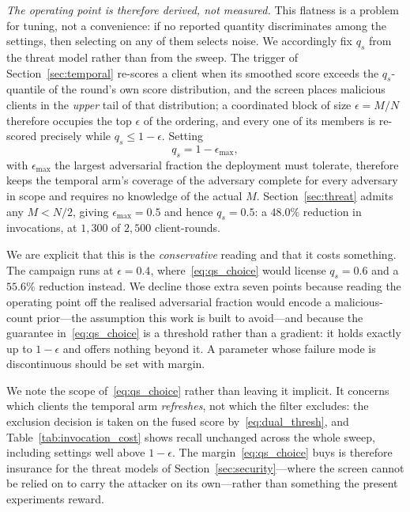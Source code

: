 \documentclass[journal]{IEEEtran}
\begin{document}
\noindent\textit{The operating point is therefore derived, not measured.} This flatness is a problem for tuning, not a convenience: if no reported quantity discriminates among the settings, then selecting on any of them selects noise. We accordingly fix $q_s$ from the threat model rather than from the sweep. The trigger of Section~\ref{sec:temporal} re-scores a client when its smoothed score exceeds the $q_s$-quantile of the round's own score distribution, and the screen places malicious clients in the \emph{upper} tail of that distribution; a coordinated block of size $\epsilon = M/N$ therefore occupies the top $\epsilon$ of the ordering, and every one of its members is re-scored precisely while $q_s \le 1 - \epsilon$. Setting
\begin{equation}
q_s = 1 - \epsilon_{\max},
\label{eq:qs_choice}
\end{equation}
with $\epsilon_{\max}$ the largest adversarial fraction the deployment must tolerate, therefore keeps the temporal arm's coverage of the adversary complete for every adversary in scope and requires no knowledge of the actual $M$. Section~\ref{sec:threat} admits any $M < N/2$, giving $\epsilon_{\max} = 0.5$ and hence $q_s = 0.5$: a $48.0\%$ reduction in invocations, at $1{,}300$ of $2{,}500$ client-rounds.

We are explicit that this is the \emph{conservative} reading and that it costs something. The campaign runs at $\epsilon = 0.4$, where~\eqref{eq:qs_choice} would license $q_s = 0.6$ and a $55.6\%$ reduction instead. We decline those extra seven points because reading the operating point off the realised adversarial fraction would encode a malicious-count prior---the assumption this work is built to avoid---and because the guarantee in~\eqref{eq:qs_choice} is a threshold rather than a gradient: it holds exactly up to $1-\epsilon$ and offers nothing beyond it. A parameter whose failure mode is discontinuous should be set with margin.

We note the scope of~\eqref{eq:qs_choice} rather than leaving it implicit. It concerns which clients the temporal arm \emph{refreshes}, not which the filter excludes: the exclusion decision is taken on the fused score by~\eqref{eq:dual_thresh}, and Table~\ref{tab:invocation_cost} shows recall unchanged across the whole sweep, including settings well above $1-\epsilon$. The margin~\eqref{eq:qs_choice} buys is therefore insurance for the threat models of Section~\ref{sec:security}---where the screen cannot be relied on to carry the attacker on its own---rather than something the present experiments reward.
\end{document}
